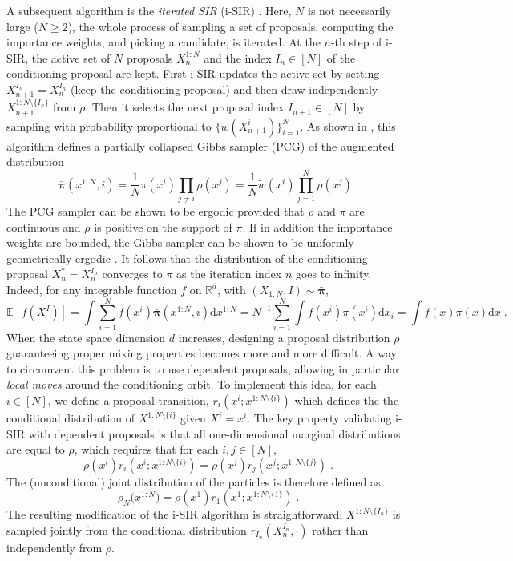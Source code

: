 \documentclass{article}
\def\rmd{\operatorname{d}\hspace{-2pt}}
\def\PE{\mathbb{E}}
\def\rset{\mathbb{R}}
\newcommand{\chunk}[3]{#1_{#2:#3}}
\def\rmd{\mathrm{d}}
\def\eqsp{\,}
\def\eqsp{\;}
\newcommand{\1}{\mathds{1}}
\def\target{\pi}
\def\proposal{\rho}
\def\weightfunc{\tilde{w}}
\newcommand{\chunku}[3]{#1^{#2:#3}}
\newcommand{\chunkum}[4]{#1^{#2:#3 \setminus \{#4\}}}
\def\measpi{\boldsymbol{\pi}}
\def\rset{\mathbb{R}}
\def\rmd{\mathrm{d}}
\begin{document}
A subsequent algorithm  is the \emph{iterated SIR} (i-SIR) \citep{andrieu2010particle}. Here, $N$ is not necessarily large ($N\geq 2$), the whole process of sampling a set of proposals, computing the importance weights, and picking a  candidate, is iterated. At the $n$-th step of i-SIR, the active set of $N$ proposals $\chunku{X_n}{1}{N}$ and the index $I_n \in [N]$ of the conditioning proposal are kept. First i-SIR  updates the active set  by setting $X_{n+1}^{I_n}= X_n^{I_n}$ (keep the conditioning proposal) and then draw independently $\chunkum{X_{n+1}}{1}{N}{I_n}$ from $\proposal$.
Then it selects the next proposal index $I_{n+1} \in [N]$ by sampling with probability
proportional to $\{\weightfunc(X_{n+1}^i)\}_{i=1}^N$.
As shown in \cite{andrieu2010particle}, this algorithm  defines  a partially collapsed Gibbs sampler (PCG) of the augmented distribution 
$$
\bar{\measpi}(\chunku{x}{1}{N},i)=\frac{1}{N}  \target(x^i) \prod_{j \neq i} \proposal(x^j) =\frac{1}{N} \weightfunc(x^i) \prod_{j=1}^N \proposal(x^j) \eqsp.
$$
The PCG sampler can be shown to be ergodic provided that $\proposal$ and $\target$ are continuous and $\proposal$  is  positive on the support of $\target$. If in addition the importance weights are bounded, the Gibbs sampler can be shown to be uniformly geometrically ergodic  \citep{lindsten2015uniform,andrieu2018uniform}.
It follows that the distribution of the conditioning proposal $X_n^*= X_n^{I_n}$ converges to $\pi$ as the iteration index $n$ goes to infinity. Indeed, for any integrable function $f$ on $\rset^d$, with $(\chunk{X}{1}{N},I) \sim \bar{\measpi}$,
$$
\PE_{}[f(X^I)]= \int \sum_{i=1}^N f(x^i)  \bar{\measpi}(\chunku{x}{1}{N},i) \rmd \chunku{x}{1}{N} = N^{-1} \sum_{i=1}^N \int f(x^i) \target(x^i) \rmd x_i = \int f(x) \target(x) \rmd x \eqsp.
$$
When the state space dimension $d$ increases, designing a proposal distribution $\proposal$ guaranteeing proper mixing properties becomes more and more difficult. A way to circumvent this problem is to use dependent proposals, allowing in particular \emph{local moves} around the conditioning orbit. To implement this idea, for each $i \in [N]$, we define a proposal transition, $r_i(x^i; \chunkum{x}{1}{N}{i})$ which defines the the conditional distribution of $\chunkum{X}{1}{N}{i}$ given  $X^i= x^i$. The key property validating i-SIR with dependent proposals  is that all one-dimensional marginal distributions are equal to $\proposal$, which requires that for each $i,j  \in [N]$,
\begin{equation}
\label{eq:conditional-decomposition}
\proposal(x^i) r_i(x^i;\chunkum{x}{1}{N}{i})=
\proposal(x^j) r_j(x^{j};\chunkum{x}{1}{N}{j})\eqsp.
\end{equation}
The (unconditional) joint distribution of the particles is therefore defined as
\begin{equation}
\label{eq:joint-distribution}
\proposal_N\bigl(\chunku{x}{1}{N}\bigr) = \proposal(x^1) r_1(x^1;\chunkum{x}{1}{N}{1}) \eqsp.
\end{equation}
The resulting modification of the i-SIR algorithm is straightforward: $\chunkum{X}{1}{N}{I_n}$ is sampled jointly from the conditional distribution $r_{I_n}(X_n^{I_n},\cdot)$ rather than independently from $\proposal$.
\end{document}
